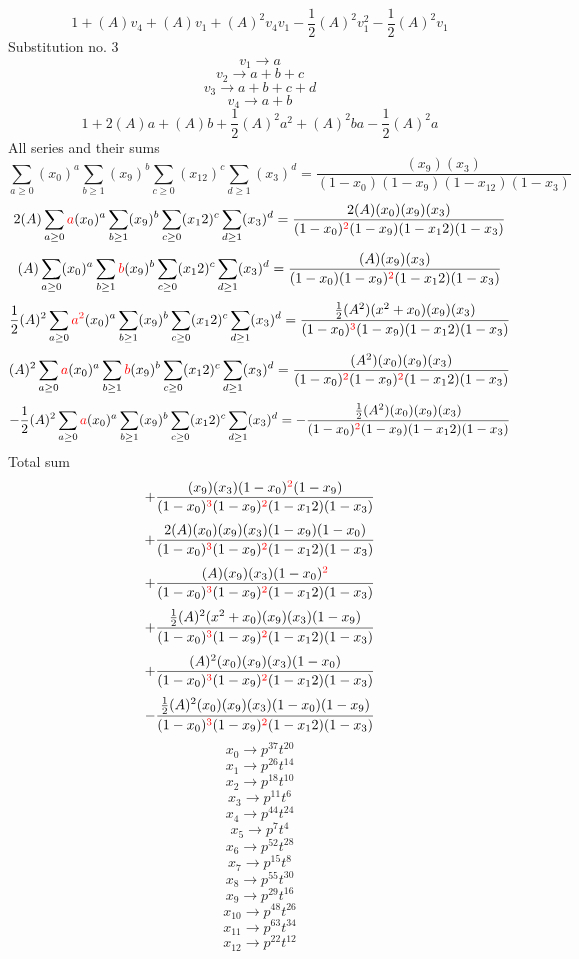 \documentclass{article}
\begin{document}
\[1+(A)v_4+(A)v_1+(A)^2v_4v_1-\frac{1}{2}(A)^2v_1^{2}-\frac{1}{2}(A)^2v_1\]Substitution no. 3\[v_1\rightarrow{a}\]\[v_2\rightarrow{a+b+c}\]\[v_3\rightarrow{a+b+c+d}\]\[v_4\rightarrow{a+b}\]\[1+2(A)a+(A)b+\frac{1}{2}(A)^2a^{2}+(A)^2ba-\frac{1}{2}(A)^2a\]All series and their sums\[\sum_{a\geq{0}}(x_0)^{a}\sum_{b\geq{1}}(x_9)^{b}\sum_{c\geq{0}}(x_12)^{c}\sum_{d\geq{1}}(x_3)^{d}=\frac{(x_9)(x_3)}{(1-x_0)(1-x_9)(1-x_12)(1-x_3)}\]\[2(A)\sum_{a\geq{0}}\textcolor{red}{a}(x_0)^{a}\sum_{b\geq{1}}(x_9)^{b}\sum_{c\geq{0}}(x_12)^{c}\sum_{d\geq{1}}(x_3)^{d}=\frac{2(A)(x_0)(x_9)(x_3)}{(1-x_0)^{\textcolor{red}{2}}(1-x_9)(1-x_12)(1-x_3)}\]\[(A)\sum_{a\geq{0}}(x_0)^{a}\sum_{b\geq{1}}\textcolor{red}{b}(x_9)^{b}\sum_{c\geq{0}}(x_12)^{c}\sum_{d\geq{1}}(x_3)^{d}=\frac{(A)(x_9)(x_3)}{(1-x_0)(1-x_9)^{\textcolor{red}{2}}(1-x_12)(1-x_3)}\]\[\frac{1}{2}(A)^{2}\sum_{a\geq{0}}\textcolor{red}{a^{2}}(x_0)^{a}\sum_{b\geq{1}}(x_9)^{b}\sum_{c\geq{0}}(x_12)^{c}\sum_{d\geq{1}}(x_3)^{d}=\frac{\frac{1}{2}(A^{2})(x^{2}+x_0)(x_9)(x_3)}{(1-x_0)^{\textcolor{red}{3}}(1-x_9)(1-x_12)(1-x_3)}\]\[(A)^{2}\sum_{a\geq{0}}\textcolor{red}{a}(x_0)^{a}\sum_{b\geq{1}}\textcolor{red}{b}(x_9)^{b}\sum_{c\geq{0}}(x_12)^{c}\sum_{d\geq{1}}(x_3)^{d}=\frac{(A^{2})(x_0)(x_9)(x_3)}{(1-x_0)^{\textcolor{red}{2}}(1-x_9)^{\textcolor{red}{2}}(1-x_12)(1-x_3)}\]\[-\frac{1}{2}(A)^{2}\sum_{a\geq{0}}\textcolor{red}{a}(x_0)^{a}\sum_{b\geq{1}}(x_9)^{b}\sum_{c\geq{0}}(x_12)^{c}\sum_{d\geq{1}}(x_3)^{d}=-\frac{\frac{1}{2}(A^{2})(x_0)(x_9)(x_3)}{(1-x_0)^{\textcolor{red}{2}}(1-x_9)(1-x_12)(1-x_3)}\]
Total sum
\[+\frac{(x_9)(x_3)(1-x_0)^{\textcolor{red}{2}}(1-x_9)}{(1-x_0)^{\textcolor{red}{3}}(1-x_9)^{\textcolor{red}{2}}(1-x_12)(1-x_3)}\]\[+\frac{2(A)(x_0)(x_9)(x_3)(1-x_9)(1-x_0)}{(1-x_0)^{\textcolor{red}{3}}(1-x_9)^{\textcolor{red}{2}}(1-x_12)(1-x_3)}\]\[+\frac{(A)(x_9)(x_3)(1-x_0)^{\textcolor{red}{2}}}{(1-x_0)^{\textcolor{red}{3}}(1-x_9)^{\textcolor{red}{2}}(1-x_12)(1-x_3)}\]\[+\frac{\frac{1}{2}(A)^{2}(x^{2}+x_0)(x_9)(x_3)(1-x_9)}{(1-x_0)^{\textcolor{red}{3}}(1-x_9)^{\textcolor{red}{2}}(1-x_12)(1-x_3)}\]\[+\frac{(A)^{2}(x_0)(x_9)(x_3)(1-x_0)}{(1-x_0)^{\textcolor{red}{3}}(1-x_9)^{\textcolor{red}{2}}(1-x_12)(1-x_3)}\]\[-\frac{\frac{1}{2}(A)^{2}(x_0)(x_9)(x_3)(1-x_0)(1-x_9)}{(1-x_0)^{\textcolor{red}{3}}(1-x_9)^{\textcolor{red}{2}}(1-x_12)(1-x_3)}\]\[x_0\rightarrow{p^{37}t^{20}}\]\[x_1\rightarrow{p^{26}t^{14}}\]\[x_2\rightarrow{p^{18}t^{10}}\]\[x_3\rightarrow{p^{11}t^{6}}\]\[x_4\rightarrow{p^{44}t^{24}}\]\[x_5\rightarrow{p^{7}t^{4}}\]\[x_6\rightarrow{p^{52}t^{28}}\]\[x_7\rightarrow{p^{15}t^{8}}\]\[x_8\rightarrow{p^{55}t^{30}}\]\[x_9\rightarrow{p^{29}t^{16}}\]\[x_10\rightarrow{p^{48}t^{26}}\]\[x_11\rightarrow{p^{63}t^{34}}\]\[x_12\rightarrow{p^{22}t^{12}}\]
\end{document}
